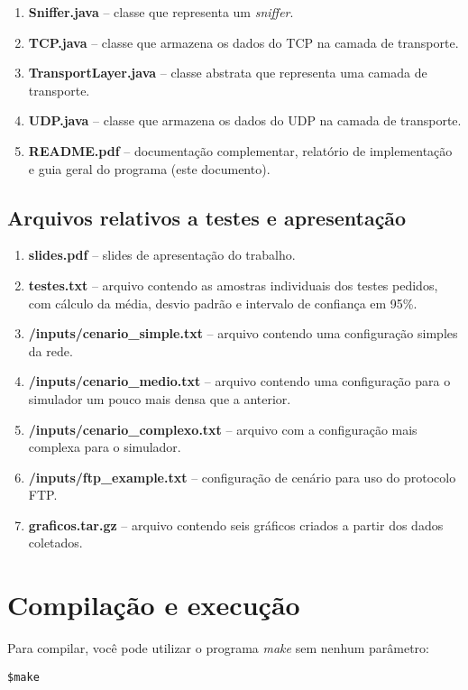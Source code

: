 \documentclass[11pt]{article}
\begin{document}
\begin{enumerate}
\item \textbf{Sniffer.java} -- classe que representa um \textit{sniffer}.
\item \textbf{TCP.java} -- classe que armazena os dados do TCP na camada de transporte.
\item \textbf{TransportLayer.java} -- classe abstrata que representa uma camada de transporte.
\item \textbf{UDP.java} -- classe que armazena os dados do UDP na camada de transporte.
\item \textbf{README.pdf} -- documentação complementar, relatório de implementação e guia geral do programa (este documento).
\end{enumerate}

\subsection{Arquivos relativos a testes e apresentação}
\begin{enumerate}
	\item \textbf{slides.pdf} -- slides de apresentação do trabalho.
	\item \textbf{testes.txt} -- arquivo contendo as amostras individuais dos testes pedidos, com cálculo da média, desvio padrão e intervalo de confiança em 95\%.
	\item \textbf{/inputs/cenario\_simple.txt} -- arquivo contendo uma configuração simples da rede.
	\item \textbf{/inputs/cenario\_medio.txt} -- arquivo contendo uma configuração para o simulador um pouco mais densa que a anterior.
	\item \textbf{/inputs/cenario\_complexo.txt} -- arquivo com a configuração mais complexa para o simulador.
	\item \textbf{/inputs/ftp\_example.txt} -- configuração de cenário para uso do protocolo FTP.
	\item \textbf{graficos.tar.gz} -- arquivo contendo seis gráficos criados a partir dos dados coletados.\\
\end{enumerate}

\section{Compilação e execução}
Para compilar, você pode utilizar o programa \textit{make} sem nenhum parâmetro:

\color{cyan}
\begin{verbatim}
$make
\end{verbatim}
\color{black}
\end{document}
